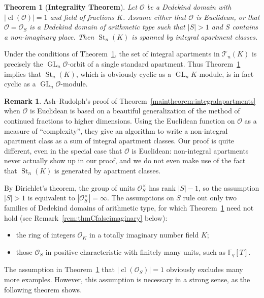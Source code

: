 \documentclass[11 pt]{article}
\theoremstyle{plain}
\newtheorem{maintheorem}{Theorem}
\theoremstyle{definition}
\newtheorem{remark}[theorem]{Remark}
\numberwithin{equation}{section}
\DeclareMathOperator{\GL}{GL}
\newcommand\Z{\ensuremath{\mathbb{Z}}}
\newcommand\Q{\ensuremath{\mathbb{Q}}}
\newcommand\F{\ensuremath{\mathbb{F}}}
\renewcommand{\O}{\mathcal{O}}
\DeclareMathOperator{\class}{cl}
\newcommand\Tits{\ensuremath{\mathcal{T}}}
\DeclareMathOperator{\St}{St}
\newcommand\abs[1]{\left\lvert#1\right\rvert}
\begin{document}

\begin{maintheorem}[\textbf{Integrality Theorem}]
\label{thm:ashrudolph}
\label{maintheorem:integralapartments}
Let $\O$ be a Dedekind domain with $\abs{\class(\O)}=1$ and field of fractions $K$. Assume either that $\O$ is Euclidean, or that $\O=\O_S$ is a Dedekind domain of arithmetic type such that $\abs{S}>1$ and $S$ contains a non-imaginary place.  Then $\St_n(K)$ is spanned by integral apartment classes.
\end{maintheorem}

Under the conditions of Theorem~\ref{thm:ashrudolph}, the 
set of 
integral apartments in $\Tits_n(K)$ is precisely the $\GL_n\O$-orbit of a single standard apartment.  Thus Theorem~\ref{thm:ashrudolph} implies that $\St_n(K)$, which is obviously cyclic as a $\GL_n K$-module, is in fact cyclic as a $\GL_n \O$-module.

\begin{remark}
Ash--Rudolph's proof \cite{AshRudolph} of Theorem~\ref{maintheorem:integralapartments}
when $\O$ is Euclidean is based on a beautiful generalization of the method of continued fractions to higher dimensions.  Using the Euclidean function on
$\O$ as a measure of ``complexity'',  they give an algorithm to write a non-integral apartment class as a sum of integral apartment classes.  Our proof is quite different, even in the special case that $\O$ is Euclidean: non-integral apartments never actually
show up in our proof, and we do not even make use of the fact that
$\St_n(K)$ is generated by apartment classes.  
\end{remark}

By Dirichlet's theorem, the group of units $\O_S^\times$ has rank $\abs{S}-1$, so the assumption $\abs{S}>1$ is equivalent to $\abs{\O_S^\times}=\infty$. The assumptions on $S$ rule out 
only two families of Dedekind domains of arithmetic type, for which Theorem~\ref{thm:ashrudolph} need not hold (see Remark~\ref{rem:thmCfalseimaginary} below):
\begin{itemize}[nosep]
\item the ring of integers $\O_K$ in a totally imaginary number field $K$;
\item those $\O_S$ in positive characteristic with finitely many units, such as $\F_q[T]$. 
\end{itemize}
The assumption in Theorem~\ref{thm:ashrudolph} that $\abs{\class(\O_S)}=1$ obviously excludes many more examples.  However, this assumption is necessary in a strong sense, as the following theorem shows.
\end{document}
